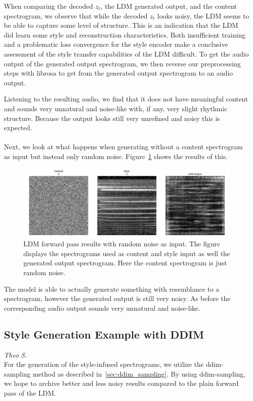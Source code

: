 \noindent When comparing the decoded \(z_t\), the LDM generated output, and the content spectrogram, we observe that while the decoded \(z_t\) looks noisy, the LDM seems to be able to capture some level of structure. This is an indication that the LDM did learn some style and reconstruction characteristics. Both insufficient training and a problematic loss convergence for the style encoder make a conclusive assessment of the style transfer capabilities of the LDM difficult. To get the audio output of the generated output spectrogram, we then reverse our preprocessing steps with librosa to get from the generated output spectrogram to an audio output.

Listening to the resulting audio, we find that it does not have meaningful content and sounds very unnatural and noise-like with, if any, very slight rhythmic structure. Because the output looks still very unrefined and noisy this is expected.
\\\\
Next, we look at what happens when generating without a content spectrogram as input but instead only random noise.
Figure~\ref{fig:ldm_forward_pass_random} shows the results of this.
\begin{figure}[h]
    \centering
    \includegraphics[width=\textwidth]{figures/test_ldm_forward_function_no_content_output_200ep.png}
    \caption{LDM forward pass results with random noise as input.
    The figure displays the spectrograms used as content and style input as well the generated output spectrogram. Here the content spectrogram is just random noise.}
    \label{fig:ldm_forward_pass_random}
\end{figure}
The model is able to actually generate something with resemblance to a spectrogram, however the generated output is still very noisy.
As before the corresponding audio output sounds very unnatural and noise-like.

\subsection{Style Generation Example with DDIM}
\textit{Theo S.}\\
For the generation of the style-infused spectrograms, we utilize the ddim-sampling method as described in~\ref{sec:ddim_sampling}.
By using ddim-sampling, we hope to archive better and less noisy results compared to the plain forward pass of the LDM.

